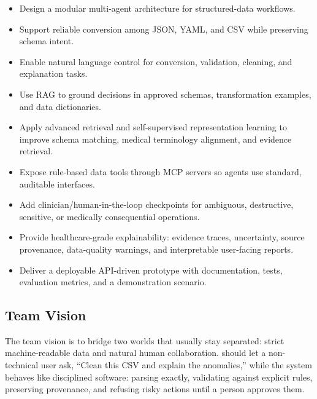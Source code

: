 \begin{itemize}
  \item Design a modular multi-agent architecture for structured-data workflows.
  \item Support reliable conversion among JSON, YAML, and CSV while preserving schema intent.
  \item Enable natural language control for conversion, validation, cleaning, and explanation tasks.
  \item Use RAG to ground decisions in approved schemas, transformation examples, and data dictionaries.
  \item Apply advanced retrieval and self-supervised representation learning to improve schema matching, medical terminology alignment, and evidence retrieval.
  \item Expose rule-based data tools through MCP servers so agents use standard, auditable interfaces.
  \item Add clinician/human-in-the-loop checkpoints for ambiguous, destructive, sensitive, or medically consequential operations.
  \item Provide healthcare-grade explainability: evidence traces, uncertainty, source provenance, data-quality warnings, and interpretable user-facing reports.
  \item Deliver a deployable API-driven prototype with documentation, tests, evaluation metrics, and a demonstration scenario.
\end{itemize}

\subsection{Team Vision}

The team vision is to bridge two worlds that usually stay separated: strict machine-readable data and natural human collaboration. \projectname{} should let a non-technical user ask, ``Clean this CSV and explain the anomalies,'' while the system behaves like disciplined software: parsing exactly, validating against explicit rules, preserving provenance, and refusing risky actions until a person approves them.
